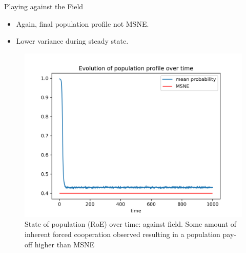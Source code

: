 \documentclass{IFES-beamer}
\begin{document}
        \begin{frame}{Playing against the Field}
            \begin{itemize}
                \item Again, final population profile not MSNE.
                \item Lower variance during steady state.
            \end{itemize}
            \begin{figure}[H]
                \centering
                \includegraphics[scale=0.4]{Images/pop_state_uni_field.png}
                \caption{State of population (RoE) over time: against field. Some amount of inherent forced cooperation observed resulting in a population pay-off higher than MSNE}
            \end{figure}
        \end{frame}

    
        
\end{document}
